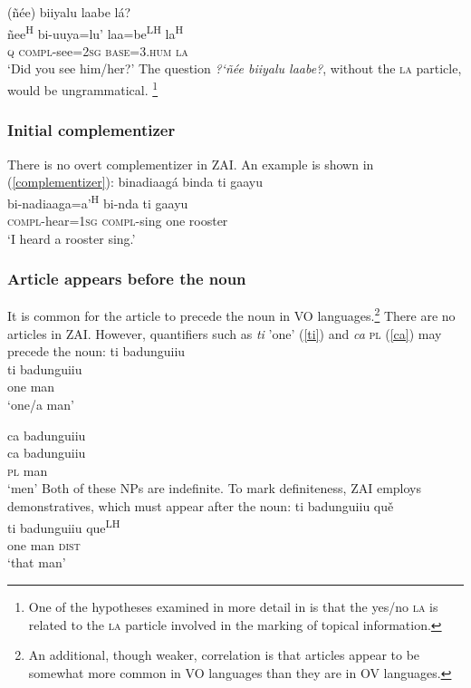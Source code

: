 \ea
{}(ñ\'{e}e) biiyalu laabe l\'{a}? \\
ñee\textsuperscript{H} bi-uuya=lu' laa=be\textsuperscript{LH} la\textsuperscript{H} \\
\textsc{q} \textsc{compl}-see=\textsc{2sg} \textsc{base}=\textsc{3.hum} \textsc{la} \\
\glt `Did you see him/her?'
\z
The question \textit{{?`}ñ\'{e}e biiyalu laabe?}, without the \textsc{la} particle, would be ungrammatical. \footnote{One of the hypotheses examined in more detail in  is that the yes/no  \textsc{la} is related to the \textsc{la} particle involved in the marking of topical information.}


\subsubsection{Initial complementizer}

There is no overt complementizer in ZAI. An example is shown in (\ref{complementizer}):
\ea\label{complementizer}
\glll binadiaag\'{a} binda ti gaayu \\
bi-nadiaaga=a'\textsuperscript{H} bi-nda ti gaayu \\
\textsc{compl}-hear=\textsc{1sg} \textsc{compl}-sing one rooster \\
\glt `I heard a rooster sing.'
\z


\subsubsection{Article appears before the noun}

It is common for the article to precede the noun in VO languages.\footnote{An additional, though weaker, correlation is that articles appear to be somewhat more common in VO languages than they are in OV languages.} There are no articles in ZAI. However, quantifiers such as \textit{ti} 'one' (\ref{ti}) and \textit{ca} \textsc{pl} (\ref{ca}) may precede the noun:
\ea\label{ti}
\glll ti badunguiiu \\
ti badunguiiu \\
one man \\
\glt `one/a man'

\z

\ea\label{ca}
\glll ca badunguiiu \\
ca badunguiiu \\
\textsc{pl} man \\
\glt `men'
\z
Both of these NPs are indefinite. To mark definiteness, ZAI employs demonstratives, which must appear after the noun:
\ea\label{ti2}
\glll ti badunguiiu qu\v{e} \\
ti badunguiiu que\textsuperscript{LH} \\
one man \textsc{dist} \\
\glt `that man'
\z

